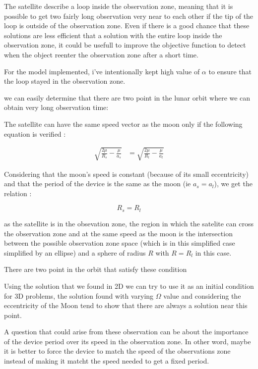 \documentclass{article} %
\begin{document}
		The satellite describe a loop inside the observation zone, meaning that it is possible to get two fairly long observation very near to each other if the tip of the loop is outside of the observation zone. Even if there is a good chance that these solutions are less efficient that a solution with the entire loop inside the observation zone, it could be usefull to improve the objective function to detect when the object reenter the observation zone after a short time.
		
		For the model implemented, i've intentionally kept high value of $\alpha$ to ensure that the loop stayed in the observation zone.		
		
		we can easily determine that there are two point in the lunar orbit where we can obtain very long observation time:
		
		The satellite can have the same speed vector as the moon only if the following equation is verified : 
		
		$$
		\begin{align}
			\sqrt{\frac{2\mu}{R_s}-\frac{\mu}{a_s}}&=\sqrt{\frac{2\mu}{R_l}-\frac{\mu}{a_l}}
		\end{align}
		$$
		
		Considering that the moon's speed is constant (because of its small eccentricity) and that the period of the device is the same as the moon (ie $a_s=a_l$), we get the relation :
		
		$$
		R_s=R_l
		$$
		
		as the satellite is in the obsevation zone, the region in which the satelite can cross the observation zone and at the same speed as the moon is the intersection between the possible observation zone space (which is in this simplified case simplified by an ellipse) and a sphere of radius $R$ with $R=R_l$ in this case.
		
		There are two point in the orbit that satisfy these condition
		
		Using the solution that we found in 2D we can try to use it as an initial condition for 3D problems, the solution found with varying $\Omega$ value and considering the eccentricity of the Moon tend to show that there are always a solution near this point.
		
		A question that could arise from these observation can be about the importance of the device period over its speed in the observation zone. In other word, maybe it is better to force the device to match the speed of the observations zone instead of making it matcht the speed needed to get a fixed period.
		
\end{document}
